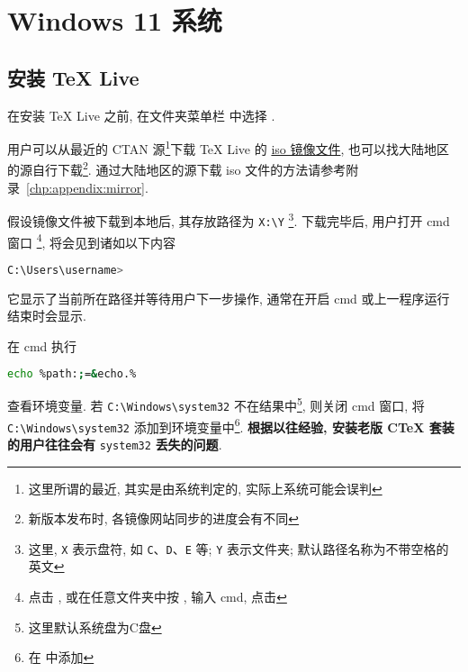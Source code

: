 
\chapter{Windows 11 系统}

\section{安装 \TeX{} Live}\label{sec:windows:install}

在安装 \TeX{} Live 之前,
在文件夹菜单栏  中选择 .

用户可以从最近的 CTAN 源\footnote{这里所谓的最近, 其实是由系统判定的, 实际上系统可能会误判}下载 \TeX{} Live 的
\href{https://mirrors.ctan.org/systems/texlive/Images/texlive2025.iso}{iso 镜像文件},
也可以找大陆地区的源自行下载\footnote{新版本发布时, 各镜像网站同步的进度会有不同}.
通过大陆地区的源下载 iso 文件的方法请参考附录~\ref{chp:appendix:mirror}.

假设镜像文件被下载到本地后,
其存放路径为 \texttt{X:\textbackslash Y}%
\footnote{这里, \texttt{X} 表示盘符,
如 \texttt{C}、\texttt{D}、\texttt{E} 等;
\texttt{Y} 表示文件夹;
默认路径名称为不带空格的英文}.
下载完毕后, 用户打开 \textsf{cmd} 窗口%
\footnote{点击 \keys{\faWindows},
或在任意文件夹中按 ,
输入 \textsf{cmd},
点击 \keys{\enter}},
将会见到诸如以下内容
\begin{lstlisting}[language = bash]
  C:\Users\username>
\end{lstlisting}
它显示了当前所在路径并等待用户下一步操作,
通常在开启 \textsf{cmd} 或上一程序运行结束时会显示.

在 \textsf{cmd} 执行
\begin{lstlisting}[language = bash]
  echo %path:;=&echo.%
\end{lstlisting}
查看环境变量. 
若 \texttt{C:\textbackslash Windows\textbackslash system32}
不在结果中\footnote{这里默认系统盘为\textsf{C}盘},
则关闭 \textsf{cmd} 窗口,
将 \texttt{C:\textbackslash Windows\textbackslash system32}
添加到环境变量中\footnote{在  中添加}.
\textbf{根据以往经验, 安装老版 C\TeX{} 套装的用户往往会有} \texttt{system32} \textbf{丢失的问题}. 

